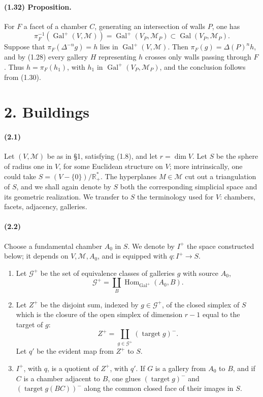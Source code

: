 \documentclass[10pt]{article}
\newcommand{\R}{\mathbb R}
\begin{document}
\paragraph{(1.32) Proposition.} For \(F\) a facet of a chamber \(C\), generating an intersection of walls \(P\), one has
\[
\pi_F^{-1}(\operatorname{Gal}^+(V,\mathcal M))
=
\operatorname{Gal}^+(V_P,\mathcal M_P)\subset \operatorname{Gal}(V_P,\mathcal M_P).
\]
Suppose that \(\pi_F(\Delta^{-n}g)=h\) lies in \(\operatorname{Gal}^+(V,\mathcal M)\). Then \(\pi_F(g)=\Delta(P)^n h\), and by (1.28) every gallery \(H\) representing \(h\) crosses only walls passing through \(F\). Thus \(h=\pi_F(h_1)\), with \(h_1\) in \(\operatorname{Gal}^+(V_P,\mathcal M_P)\), and the conclusion follows from (1.30).

\section*{2. Buildings}

\paragraph{(2.1)} Let \((V,\mathcal M)\) be as in §1, satisfying (1.8), and let \(r=\dim V\). Let \(S\) be the sphere of radius one in \(V\), for some Euclidean structure on \(V\); more intrinsically, one could take \(S=(V-\{0\})/\R^*_+\). The hyperplanes \(M\in\mathcal M\) cut out a triangulation of \(S\), and we shall again denote by \(S\) both the corresponding simplicial space and its geometric realization. We transfer to \(S\) the terminology used for \(V\): chambers, facets, adjacency, galleries.

\paragraph{(2.2)} Choose a fundamental chamber \(A_0\) in \(S\). We denote by \(I^+\) the space constructed below; it depends on \(V,\mathcal M,A_0\), and is equipped with \(q:I^+\to S\).
\begin{enumerate}[label=\alph*)]
\item Let \(\mathcal G^+\) be the set of equivalence classes of galleries \(g\) with source \(A_0\),
\[
\mathcal G^+=\coprod_B\operatorname{Hom}_{\operatorname{Gal}^+}(A_0,B).
\]
\item Let \(Z^+\) be the disjoint sum, indexed by \(g\in\mathcal G^+\), of the closed simplex of \(S\) which is the closure of the open simplex of dimension \(r-1\) equal to the target of \(g\):
\[
Z^+=\coprod_{g\in\mathcal G^+}(\operatorname{target}g)^{-}.
\]
Let \(q'\) be the evident map from \(Z^+\) to \(S\).
\item \(I^+\), with \(q\), is a quotient of \(Z^+\), with \(q'\). If \(G\) is a gallery from \(A_0\) to \(B\), and if \(C\) is a chamber adjacent to \(B\), one glues \((\operatorname{target}g)^{-}\) and \((\operatorname{target}g(BC))^{-}\) along the common closed face of their images in \(S\).
\end{enumerate}
\end{document}

